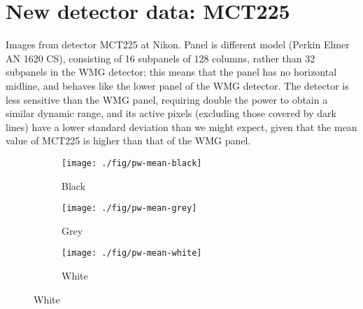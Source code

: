 \documentclass[10pt,fleqn]{article}
\begin{document}
\section{New detector data: MCT225}

Images from detector MCT225 at Nikon. Panel is different model (Perkin Elmer AN 1620 CS), consisting of 16 subpanels of 128 columns, rather than 32 subpanels in the WMG detector; this means that the panel has no horizontal midline, and behaves like the lower panel of the WMG detector. The detector is less sensitive than the WMG panel, requiring double the power to obtain a similar dynamic range, and its active pixels (excluding those covered by dark lines) have a lower standard deviation than we might expect, given that the mean value of MCT225 is higher than that of the WMG panel.


\begin{figure}[!ht]
\caption{Pixelwise means from MCT225}
\centering

\begin{subfigure}[t]{0.32\textwidth}
\caption{Black}
\texttt{[image: ./fig/pw-mean-black]}
\end{subfigure}
%
\begin{subfigure}[t]{0.32\textwidth}
\caption{Grey}
\texttt{[image: ./fig/pw-mean-grey]}
\end{subfigure}
%
\begin{subfigure}[t]{0.32\textwidth}
\caption{White}
\texttt{[image: ./fig/pw-mean-white]}
\end{subfigure}
\end{figure}
\end{document}
